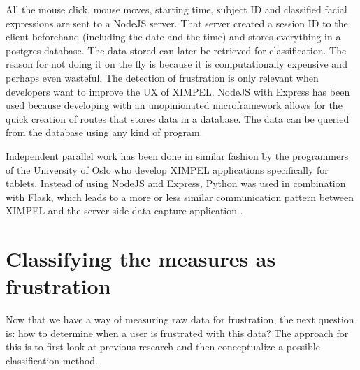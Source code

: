 All the mouse click, mouse moves, starting time, subject ID and classified facial expressions are sent to a NodeJS server. That server created a session ID to the client beforehand (including the date and the time) and stores everything in a postgres database. The data stored can later be retrieved for classification. The reason for not doing it on the fly is because it is computationally expensive and perhaps even wasteful. The detection of frustration is only relevant when developers want to improve the UX of XIMPEL. NodeJS with Express has been used because developing with an unopinionated microframework allows for the quick creation of routes that stores data in a database. The data can be queried from the database using any kind of program. 

Independent parallel work has been done in similar fashion by the programmers of the University of Oslo who develop XIMPEL applications specifically for tablets. Instead of using NodeJS and Express, Python was used in combination with Flask, which leads to a more or less similar communication pattern between XIMPEL and the server-side data capture application \cite{ximpel_norway_datacapture_server}. 



\section{Classifying the measures as frustration} %

Now that we have a way of measuring raw data for frustration, the next question is: how to determine when a user is frustrated with this data? The approach for this is to first look at previous research and then conceptualize a possible classification method.


